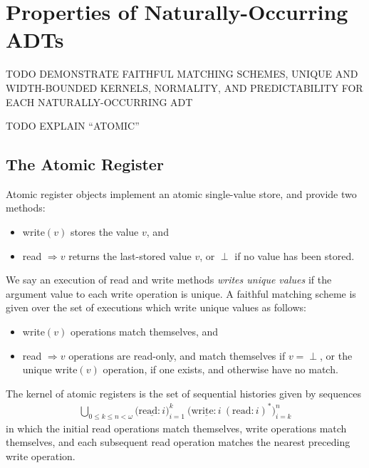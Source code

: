 \section{Properties of Naturally-Occurring ADTs}
\label{sec:nature}

TODO DEMONSTRATE FAITHFUL MATCHING SCHEMES, UNIQUE AND WIDTH-BOUNDED KERNELS,
NORMALITY, AND PREDICTABILITY FOR EACH NATURALLY-OCCURRING ADT

TODO EXPLAIN “ATOMIC”

\subsection{The Atomic Register}

Atomic register objects implement an atomic single-value store, and provide two
methods:
\begin{itemize}

  \item write$(v)$ stores the value $v$, and

  \item read $\Rightarrow v$ returns the last-stored value $v$, or $\perp$
  if no value has been stored.

\end{itemize}
We say an execution of read and write methods \emph{writes unique values} if
the argument value to each write operation is unique. A faithful matching
scheme is given over the set of executions which write unique values as follows:
\begin{itemize}

  \item write$(v)$ operations match themselves, and

  \item read $\Rightarrow v$ operations are read-only, and match themselves if
  $v = \perp$, or the unique write$(v)$ operation, if one exists, and otherwise 
  have no match.

\end{itemize}
The kernel of atomic registers is the set of sequential histories given by
sequences
\begin{align*}
  \bigcup_{0 \le k \le n < \omega}
  \Big( \underline{\mathrm{read}:i} \Big)_{i=1}^{k}\ 
  \Big( \underline{\mathrm{write}:i}\ (\mathrm{read}:i)^\ast \Big)_{i=k}^{n}
\end{align*}
in which the initial read operations match themselves, write operations match
themselves, and each subsequent read operation matches the nearest preceding
write operation.

